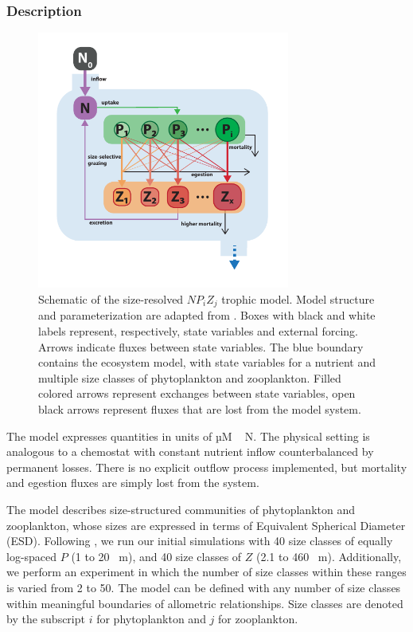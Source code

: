 \documentclass[gmd, manuscript]{copernicus}
\begin{document}
\subsubsection{Description}
\begin{figure}[t]
\includegraphics[width=8.3cm]{Figures/firstdraft_schematics/03_schematics_ASTroCAT.pdf}
\caption{Schematic of the size-resolved $NP_{i}Z_{j}$ trophic model. Model structure and parameterization are adapted from \citet{Banas2011b}. 
Boxes with black and white labels represent, respectively, state variables and external forcing. Arrows indicate fluxes between state variables. The blue boundary contains the ecosystem model, with state variables for a nutrient and multiple size classes of phytoplankton and zooplankton. Filled colored arrows represent exchanges between state variables, open black arrows represent fluxes that are lost from the model system.}
\label{Figure:ModelSchematics_3}
\end{figure}

The model expresses quantities in units of \unit{µM\,N}. The physical setting is analogous to a chemostat with constant nutrient inflow counterbalanced by permanent losses. There is no explicit outflow process implemented, but mortality and egestion fluxes are simply lost from the system. 

The model describes size-structured communities of phytoplankton and zooplankton, whose sizes are expressed in terms of Equivalent Spherical Diameter (ESD). Following \citet{Banas2011b}, we run our initial simulations with 40 size classes of equally log-spaced $P$ (1 to 20 \unit{\mu m}), and 40 size classes of $Z$ (2.1 to 460  \unit{\mu m}). Additionally, we perform an experiment in which the number of size classes within these ranges is varied from 2 to 50. The model can be defined with any number of size classes within meaningful boundaries of allometric relationships. Size classes are denoted by the subscript $i$ for phytoplankton and $j$ for zooplankton.
\end{document}
